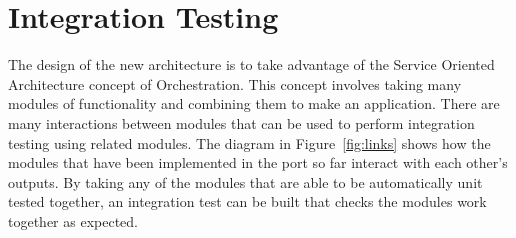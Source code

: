 \documentclass[english,12pt]{scrartcl}
\begin{document}
\section{Integration Testing}
	The design of the new architecture is to take advantage of the Service Oriented Architecture concept of Orchestration.
	This concept involves taking many modules of functionality and combining them to make an application.
	There are many interactions between modules that can be used to perform integration testing using related modules.
	The diagram in Figure~\ref{fig:links} shows how the modules that have been implemented in the port so far interact with each other's outputs.
	By taking any of the modules that are able to be automatically unit tested together, an integration test can be built that checks the modules work together as expected.
\end{document}
